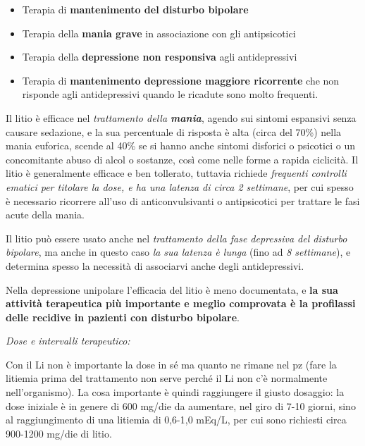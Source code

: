 \documentclass[]{article}
\begin{document}
\begin{itemize}
\item
  Terapia di \textbf{mantenimento del disturbo bipolare}
\end{itemize}

\begin{itemize}
\item
  Terapia della \textbf{mania grave} in associazione con gli
  antipsicotici
\item
  Terapia della \textbf{depressione non responsiva} agli antidepressivi
\item
  Terapia di \textbf{mantenimento depressione maggiore ricorrente} che
  non risponde agli antidepressivi quando le ricadute sono molto
  frequenti.
\end{itemize}

Il litio è efficace nel \emph{trattamento della \textbf{mania}}, agendo
sui sintomi espansivi senza causare sedazione, e la sua percentuale di
risposta è alta (circa del 70\%) nella mania euforica, scende al 40\% se
si hanno anche sintomi disforici o psicotici o un concomitante abuso di
alcol o sostanze, così come nelle forme a rapida ciclicità. Il litio è
generalmente efficace e ben tollerato, tuttavia richiede \emph{frequenti
controlli ematici per titolare la dose, e ha una latenza di circa 2
settimane}, per cui spesso è necessario ricorrere all'uso di
anticonvulsivanti o antipsicotici per trattare le fasi acute della
mania.

Il litio può essere usato anche nel \emph{trattamento della fase
depressiva del disturbo bipolare}, ma anche in questo caso \emph{la sua
latenza è lunga} (fino ad \emph{8 settimane}), e determina spesso la
necessità di associarvi anche degli antidepressivi.

Nella depressione unipolare l'efficacia del litio è meno documentata, e
\textbf{la sua attività terapeutica più importante e meglio comprovata è
la profilassi delle recidive in pazienti con disturbo bipolare}.

\emph{\emph{Dose e intervalli terapeutico:}}

Con il Li non è importante la dose in sé ma quanto ne rimane nel pz
(fare la litiemia prima del trattamento non serve perché il Li non c'è
normalmente nell'organismo). La cosa importante è quindi raggiungere il
giusto dosaggio: la dose iniziale è in genere di 600 mg/die da
aumentare, nel giro di 7-10 giorni, sino al raggiungimento di una
litiemia di 0,6-1,0 mEq/L, per cui sono richiesti circa 900-1200 mg/die
di litio.
\end{document}

